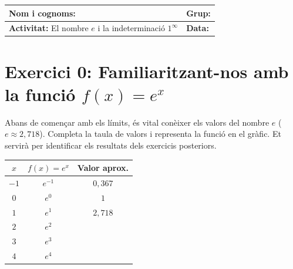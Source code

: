 \documentclass[12pt,a4paper]{article}
\begin{document}
\begingroup
\renewcommand{\arraystretch}{2.0}
\begin{tabularx}{\textwidth}{|X|p{4cm}|}
    \hline
    \textbf{Nom i cognoms:} & \textbf{Grup:} \\ \hline
    \textbf{Activitat:} El nombre $e$ i la indeterminació $1^\infty$ & \textbf{Data:} \\ \hline
\end{tabularx}
\endgroup

\vspace{0.5cm}

\section*{Exercici 0: Familiaritzant-nos amb la funció $f(x) = e^x$}

Abans de començar amb els límits, és vital conèixer els valors del nombre $e$ ($e \approx 2,718$). Completa la taula de valors i representa la funció en el gràfic. Et servirà per identificar els resultats dels exercicis posteriors.

\begin{minipage}{0.45\textwidth}
\centering
\renewcommand{\arraystretch}{1.5}
\begin{tabular}{|c|c|c|}
    \hline
    $x$ & $f(x) = e^x$ & Valor aprox. \\ \hline
    $-1$ & $e^{-1}$ & $0,367$ \\ \hline
    $0$ & $e^0$ & $1$ \\ \hline
    $1$ & $e^1$ & $2,718$ \\ \hline
    $2$ & $e^2$ &  \\ \hline
    $3$ & $e^3$ &  \\ \hline
    $4$ & $e^4$ &  \\ \hline
\end{tabular}
\end{minipage}
\begin{minipage}{0.5\textwidth}
\centering
{}
\end{minipage}
\end{document}
